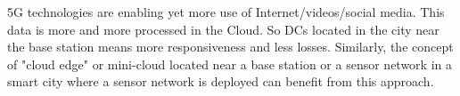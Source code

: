 5G technologies are enabling yet more use of Internet/videos/social media. This data is more and more processed in the Cloud. So DCs located in the city near the base station means more responsiveness and less losses. Similarly, the concept of "cloud edge" or mini-cloud located near a base station or a sensor network in a smart city where a sensor network is deployed can benefit from this approach. %